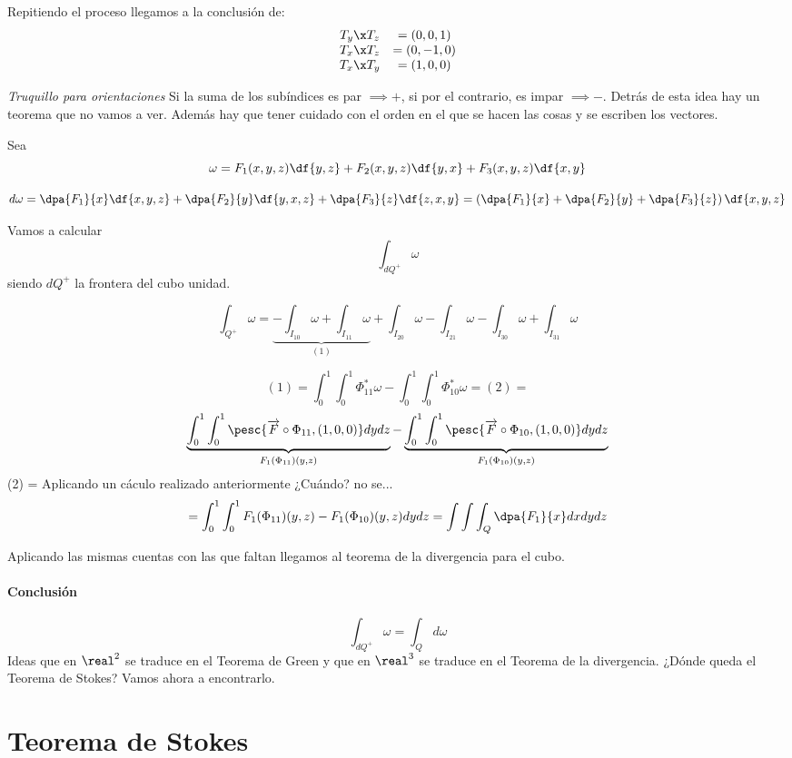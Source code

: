 Repitiendo el proceso llegamos a la conclusión de: \[
\begin{array}{cc}
T_y\x T_z &= (0,0,1)\\
T_x\x T_z &= (0,-1,0)\\
T_x\x T_y &= (1,0,0)
\end{array}\]

\textit{Truquillo para orientaciones} Si la suma de los subíndices es par $\implies +$, si por el contrario, es impar $\implies -$. Detrás de esta idea hay un teorema que no vamos a ver. Además hay que tener cuidado con el orden en el que se hacen las cosas y se escriben los vectores.

Sea
\[\omega = F_1(x,y,z)\df{y,z}+F_2(x,y,z)\df{y,x}+F_3(x,y,z)\df{x,y}\]
 
\[d\omega = \dpa{F_1}{x}\df{x,y,z} + \dpa{F_2}{y}\df{y,x,z} + \dpa{F_3}{z}\df{z,x,y} = \left(\dpa{F_1}{x}+\dpa{F_2}{y} + \dpa{F_3}{z}\right) \df{x,y,z}
\]

Vamos a calcular \[\int_{dQ^+} \omega\] siendo $dQ^+$ la frontera del cubo unidad.

\[\int_{Q^+} \omega =\underbrace{ -\int_{I_{10}} \omega +  \int_{I_{11}} \omega}_{(1)} + \int_{I_{20}} \omega -  \int_{I_{21}} \omega  -\int_{I_{30}} \omega +  \int_{I_{31}} \omega\]

\[
(1) = \int_0^1\int_0^1\Phi^{\ast}_{11}\omega - \int_0^1\int_0^1 \Phi^{\ast}_{10} \omega = (2) =\]
\[
 \underbrace{\int_0^1\int_0^1 \pesc{\overrightarrow{F}\circ \Phi_{11},(1,0,0)}dydz}_{F_1(\Phi_{11})(y,z)}
 - \underbrace{ \int_0^1\int_0^1 \pesc{\overrightarrow{F}\circ \Phi_{10},(1,0,0)}dydz}_{F_1(\Phi_{10})(y,z)}
\]
(2) = Aplicando un cáculo realizado anteriormente ¿Cuándo? no se...
\[
= \int_0^1\int_0^1 F_1(\Phi_{11})(y,z)-F_1(\Phi_{10})(y,z)dydz = \int\int\int_Q \dpa{F_1}{x}dxdydz
\]

Aplicando las mismas cuentas con las que faltan llegamos al teorema de la divergencia para el cubo.


\paragraph{Conclusión}
\[\int_{dQ^+} \omega = \int_{Q}d\omega\]
Ideas que en $\real^2$ se traduce en el Teorema de Green y que en $\real^3$ se traduce en el Teorema de la divergencia. ¿Dónde queda el Teorema de Stokes? Vamos ahora a encontrarlo.

\section{Teorema de Stokes}

